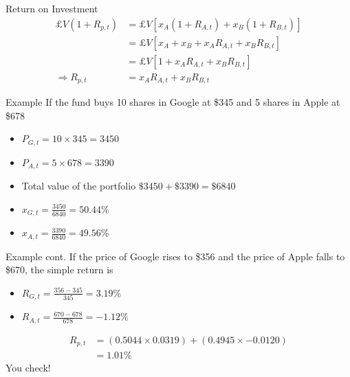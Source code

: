 \documentclass[14pt,xcolor=pdftex,dvipsnames,table]{beamer}
\begin{document}
\begin{frame}{Return on Investment}
\begin{align*}
£V(1+R_{p,t}) &= £V[x_A (1+R_{A,t}) + x_B (1+R_{B, t})]\\
& = £V[x_A + x_B + x_A R_{A,t} + x_B R_{B,t}]\\
& = £V[1 + x_A R_{A,t} + x_B R_{B,t}]\\
\Rightarrow R_{p,t} & = x_A R_{A,t} + x_B R_{B,t}
\end{align*}
\end{frame}

\begin{frame}{Example}
If the fund buys 10 shares in Google at \$345 and 5 shares in Apple at \$678
\begin{itemize}
\item $P_{G,t} = 10 \times 345 = 3450$
\item $P_{A,t} = 5 \times 678 = 3390$
\item Total value of the portfolio $\$3450 + \$3390 = \$6840$
\item $x_{G,t} = \frac{3450}{6840} = 50.44\%$
\item $x_{A,t} = \frac{3390}{6840} = 49.56\%$
\end{itemize}
\end{frame}

\begin{frame}{Example cont.}
If the price of Google rises to \$356 and the price of Apple falls to \$670, the simple return is 
\begin{itemize}
\item $R_{G,t} = \frac{356 - 345}{345} = 3.19\%$
\item $R_{A,t} = \frac{670-678}{678} = -1.12\%$
\end{itemize}
\begin{align*}
R_{p,t} & = (0.5044 \times 0.0319) + (0.4945 \times -0.0120)\\
& = 1.01\%
\end{align*}
You check!
\end{frame}

\end{document}
